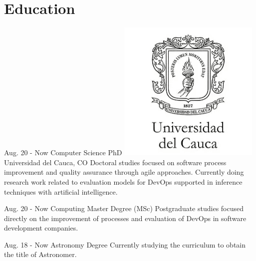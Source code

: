 \documentclass[american]{cv-class}
\begin{document}
\section{Education}
\begin{entrylist}
	\entry
	{Aug. 20 - Now}
	{Computer Science PhD}
	{{\includegraphics[scale=0.05]{img/unicauca-logo.png}} Universidad del Cauca, CO} 
	{\justifying Doctoral studies focused on software process improvement and quality assurance through agile approaches. Currently doing research work related to evaluation models for DevOps supported in inference techniques with artificial intelligence.}
	
	\entry
	{Aug. 20 - Now}
	{Computing Master Degree (MSc)}
	{ }
	{\justifying Postgraduate studies focused directly on the improvement of processes and evaluation of DevOps in software development companies.}
	
	\entry
	{Aug. 18 - Now}
	{Astronomy Degree}
	{ }
	{\justifying Currently studying the curriculum to obtain the title of Astronomer.}
	

\end{entrylist}
\end{document}
